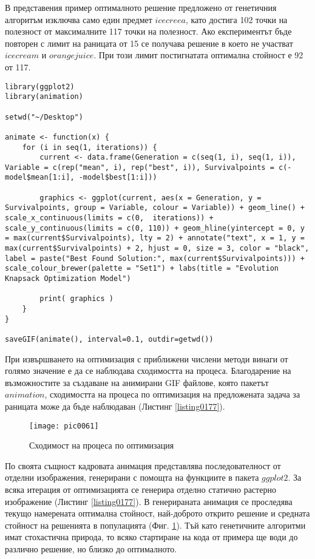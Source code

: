 В представения пример оптималното решение предложено от генетичния алгоритъм изключва само един предмет $ice creea$, като достига 102 точки на полезност от максималните 117 точки на полезност. Ако експериментът бъде повторен с лимит на раницата от 15 се получава решение в което не участват $ice cream$ и $orange juice$. При този лимит постигнатата оптимална стойност е 92 от 117. 

\begin{lstlisting}[caption=Анимирана визуализация на процеса по търсене на оптимално решение, label=listing0177]
library(ggplot2)
library(animation)

setwd("~/Desktop")

animate <- function(x) {
	for (i in seq(1, iterations)) {
		current <- data.frame(Generation = c(seq(1, i), seq(1, i)), Variable = c(rep("mean", i), rep("best", i)), Survivalpoints = c(-model$mean[1:i], -model$best[1:i]))

		graphics <- ggplot(current, aes(x = Generation, y = Survivalpoints, group = Variable, colour = Variable)) + geom_line() + scale_x_continuous(limits = c(0,  iterations)) + scale_y_continuous(limits = c(0, 110)) + geom_hline(yintercept = 0, y = max(current$Survivalpoints), lty = 2) + annotate("text", x = 1, y = max(current$Survivalpoints) + 2, hjust = 0, size = 3, color = "black", label = paste("Best Found Solution:", max(current$Survivalpoints))) + scale_colour_brewer(palette = "Set1") + labs(title = "Evolution Knapsack Optimization Model")

		print( graphics )
    }
}

saveGIF(animate(), interval=0.1, outdir=getwd())
\end{lstlisting}

При извършването на оптимизация с приближени числени методи винаги от голямо значение е да се наблюдава сходимостта на процеса. Благодарение на възможностите за създаване на анимирани GIF файлове, която пакетът $animation$, сходимостта на процеса по оптимизация на предложената задача за раницата може да бъде наблюдаван (Листинг \ref{listing0177}).

\begin{figure}[h!]
  \centering
  \texttt{[image: pic0061]}
  \caption{Сходимост на процеса по оптимизация}
\label{figure0061}
\end{figure}
\FloatBarrier

По своята същност кадровата анимация представлява последователност от отделни изображения, генерирани с помощта на функциите в пакета $ggplot2$. За всяка итерация от оптимизацията се генерира отделно статично растерно изображение (Листинг \ref{listing0177}). В генерираната анимация се проследява текущо намерената оптимална стойност, най-доброто открито решение и средната стойност на решенията в популацията (Фиг. \ref{figure0061}). Тъй като генетичните алгоритми имат стохастична природа, то всяко стартиране на кода от примера ще води до различно решение, но близко до оптималното. 


